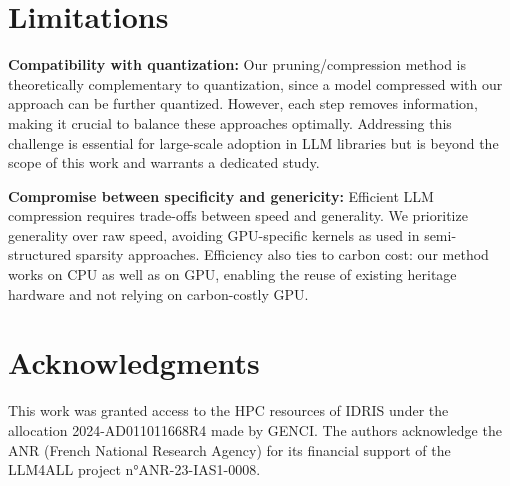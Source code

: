 \documentclass[11pt]{article}
\newcommand{\myparagraph}[1]{\noindent\textbf{#1}}
\begin{document}
\section{Limitations}

\myparagraph{Compatibility with quantization:} Our pruning/compression method is theoretically complementary to quantization, since a model compressed with our approach can be further quantized. However, each step removes information, making it crucial to balance these approaches optimally. Addressing this challenge is essential for large-scale adoption in LLM libraries but is beyond the scope of this work and warrants a dedicated study.

\myparagraph{Compromise between specificity and genericity:} Efficient LLM compression requires trade-offs between speed and generality. We prioritize generality over raw speed, avoiding GPU-specific kernels as used in semi-structured sparsity approaches. Efficiency also ties to carbon cost: our method works on CPU as well as on
GPU, enabling the reuse of existing heritage hardware and not relying on carbon-costly GPU.

\section{Acknowledgments}

This work was granted access to the HPC resources of IDRIS under the allocation 2024-AD011011668R4 made by GENCI. The authors acknowledge the ANR (French National Research Agency) for its financial support of the LLM4ALL project n°ANR-23-IAS1-0008.
\end{document}
